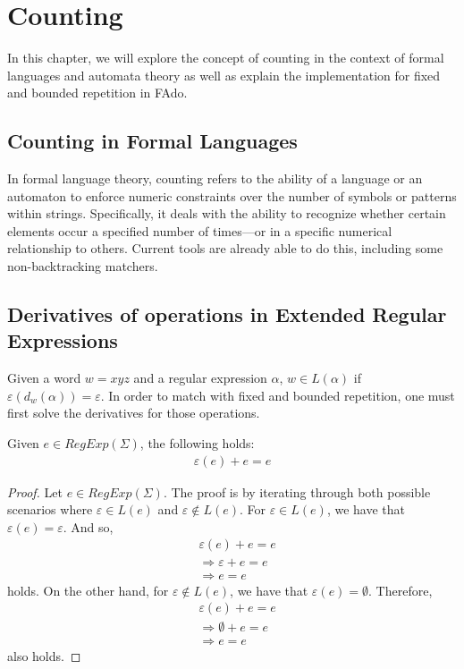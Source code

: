 \chapter{Counting}\label{chap:counting}
In this chapter, we will explore the concept of counting in the context of formal languages and automata theory as well as explain the implementation for fixed and bounded repetition in FAdo.

\section{Counting in Formal Languages}
In formal language theory, counting refers to the ability of a language or an automaton to enforce numeric constraints over the number of symbols or patterns within strings. Specifically, it deals with the ability to recognize whether certain elements occur a specified number of times—or in a specific numerical relationship to others.
Current tools are already able to do this, including some non-backtracking matchers.

\section{Derivatives of operations in Extended Regular Expressions} %
Given a word $w = xyz$ and a regular expression $\alpha$, $w \in L(\alpha)$ if $\varepsilon(d_w(\alpha)) = \varepsilon$.
In order to match with fixed and bounded repetition, one must first solve the derivatives for those operations.

\begin{thm}
	Given $e \in RegExp(\Sigma)$, the following holds:
	\begin{align*}
		\varepsilon(e) + e = e
	\end{align*}
\end{thm}
\begin{proof}
	Let $e \in RegExp(\Sigma)$. The proof is by iterating through both possible scenarios where $\varepsilon \in L(e)$ and $\varepsilon \notin L(e)$.
	For $\varepsilon \in L(e)$, we have that $\varepsilon(e) = \varepsilon$. And so,
	\begin{align*}
		& \varepsilon(e) + e = e \\
		& \Rightarrow \varepsilon + e = e \\
		& \Rightarrow e = e
	\end{align*}
	holds. On the other hand, for $\varepsilon \notin L(e)$, we have that $\varepsilon(e) = \emptyset$. Therefore,
	\begin{align*}
		& \varepsilon(e) + e = e \\
		& \Rightarrow \emptyset + e = e \\
		& \Rightarrow e = e
	\end{align*}
	also holds.
\end{proof}

